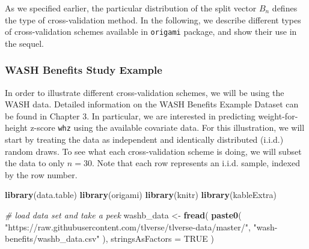 \documentclass[12pt, krantz2,]{krantz}
\newenvironment{Shaded}{\begin{snugshade}}{\end{snugshade}}
\newcommand{\CommentTok}[1]{\textcolor[rgb]{0.37,0.37,0.37}{\textit{#1}}}
\newcommand{\DataTypeTok}[1]{\textcolor[rgb]{0.27,0.27,0.27}{#1}}
\newcommand{\KeywordTok}[1]{\textcolor[rgb]{0.27,0.27,0.27}{\textbf{#1}}}
\newcommand{\NormalTok}[1]{#1}
\newcommand{\OtherTok}[1]{\textcolor[rgb]{0.37,0.37,0.37}{#1}}
\newcommand{\StringTok}[1]{\textcolor[rgb]{0.5,0.5,0.5}{#1}}
\theoremstyle{definition}
\theoremstyle{definition}
\theoremstyle{definition}
\newcommand{\1}{\mathbbm{1}}
\begin{document}
As we specified earlier, the particular distribution of the split vector \(B_n\)
defines the type of cross-validation method. In the following, we describe
different types of cross-validation schemes available in \texttt{origami} package, and
show their use in the sequel.

\hypertarget{wash-benefits-study-example}{%
\subsubsection*{WASH Benefits Study Example}\label{wash-benefits-study-example}}


In order to illustrate different cross-validation schemes, we will be using the
WASH data. Detailed information on the WASH Benefits Example Dataset can be
found in \protect\hypertarget{data}{}{Chapter 3}. In particular, we are interested in predicting
weight-for-height z-score \texttt{whz} using the available covariate data. For this
illustration, we will start by treating the data as independent and identically
distributed (i.i.d.) random draws. To see what each cross-validation scheme is
doing, we will subset the data to only \(n=30\). Note that each row represents an
i.i.d. sample, indexed by the row number.

\begin{Shaded}
\begin{Highlighting}[]
\KeywordTok{library}\NormalTok{(data.table)}
\KeywordTok{library}\NormalTok{(origami)}
\KeywordTok{library}\NormalTok{(knitr)}
\KeywordTok{library}\NormalTok{(kableExtra)}

\CommentTok{# load data set and take a peek}
\NormalTok{washb_data <-}\StringTok{ }\KeywordTok{fread}\NormalTok{(}
  \KeywordTok{paste0}\NormalTok{(}
    \StringTok{"https://raw.githubusercontent.com/tlverse/tlverse-data/master/"}\NormalTok{,}
    \StringTok{"wash-benefits/washb_data.csv"}
\NormalTok{  ),}
  \DataTypeTok{stringsAsFactors =} \OtherTok{TRUE}
\NormalTok{)}
\end{Highlighting}
\end{Shaded}
\end{document}
